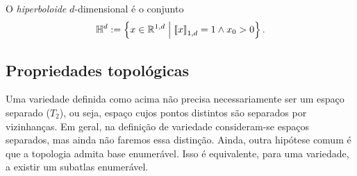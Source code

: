 \begin{definition}
O \emph{hiperboloide} $d$-dimensional é o conjunto
	\begin{equation*}
	\mathbb{H}^d := \left\{{x \in \mathbb{R}^{1,d}}\;\middle\vert\;{\left\llbracket{x}\right\rrbracket_{1,d} = 1 \land x_0 > 0}\right\}.
	\end{equation*}
\end{definition}




\subsection{Propriedades topológicas}

Uma variedade definida como acima não precisa necessariamente ser um espaço separado ($T_2$), ou seja, espaço cujos pontos distintos são separados por vizinhanças. Em geral, na definição de variedade consideram-se espaços separados, mas ainda não faremos essa distinção. Ainda, outra hipótese comum é que a topologia admita base enumerável. Isso é equivalente, para uma variedade, a existir um subatlas enumerável.

